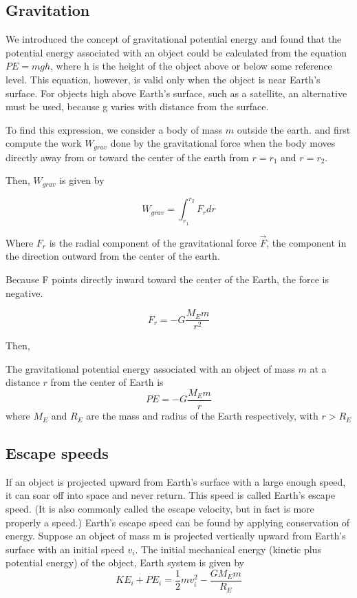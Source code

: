 \subsection{Gravitation}
We introduced the concept of gravitational potential energy and found that the potential energy associated with an object could be calculated from the equation $PE=mgh$, where h is the height of the object above or below some reference level. This equation, however, is valid only when the object is near Earth's surface. For objects high above Earth's surface, such as a satellite, an alternative must be used, because g varies with distance from the surface.

To find this expression, we consider a body of mass $m$ outside the earth. and first compute the work $W_{grav}$ done by the gravitational force when the body moves directly away from or toward the center of the earth from $r=r_1$ and $r=r_2$.

Then, $W_{grav}$ is given by

$$W_{grav} = \int_{r_1}^{r_2} F_r dr$$

Where $F_r$ is the radial component of the gravitational force $\vec{F}$, the component in the direction outward from the center of the earth.

Because F points directly inward toward the center of the Earth, the force is negative.

$$F_r = -G\frac{M_Em}{{r}^2}$$

Then,

\begin{form}
The gravitational potential energy associated with an object of mass $m$ at a distance $r$ from the center of Earth is
$$PE = -G\frac{M_E m}{r}$$
where $M_E$ and $R_E$ are the mass and radius of the Earth respectively, with $r > R_E$
\end{form}

\subsection{Escape speeds}
If an object is projected upward from Earth's surface with a large enough speed, it can soar off into space and never return. This speed is called Earth's escape speed. (It is also commonly called the escape velocity, but in fact is more properly a speed.) Earth's escape speed can be found by applying conservation of energy. Suppose an object of mass m is projected vertically upward from Earth's surface with an initial speed $v_i$. The initial mechanical energy (kinetic plus potential energy) of the object,  Earth system is given by
$$KE_i + PE_i = \frac{1}{2}mv_i^2 - \frac{G M_E m}{R_E}$$

